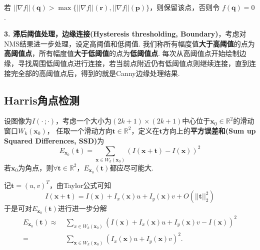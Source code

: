 \documentclass[12pt, a4paper, oneside]{ctexart}
\numberwithin{equation}{section}  %
\theoremstyle{definition}
\def\bd{\boldsymbol}        %
\def\R{\mathbb{R}}          %
\def\add{\vspace{1ex}}      %
\begin{document}
若
\(||\nabla f||(\boldsymbol{q}) > \max\bigg\{||\nabla f||(\boldsymbol{r}),||\nabla f||(\boldsymbol{p})\bigg\}\)，则保留该点，否则令
\(f(\boldsymbol{q}) = 0\).\add

\textbf{3. 滞后阈值处理，边缘连接(Hysteresis thresholding, Boundary)}，考虑对NMS结果进一步处理，设定高阈值和低阈值.
我们称所有幅度值\textbf{大于高阈值}的点为\textbf{高阈值点}，所有幅度值\textbf{大于低阈值}的点为\textbf{低阈值点}.
每次从高阈值点开始绘制边缘，寻找周围低阈值点进行连接，若当前点附近仍有低阈值点则继续连接，直到连接完全部的高阈值点后，得到的就是Canny边缘处理结果.

\subsection{Harris角点检测}  %
设图像为$I(\cdot\, ;\cdot)$，考虑一个大小为$(2k+1)\times (2k+1)$中心位于$\bd{x}_0\in\R^2$的滑动窗口$W_k(\bd{x}_0)$，
任取一个滑动方向$\bd{t}\in\R^2$，定义在$\bd{t}$方向上的\textbf{平方误差和(Sum up Squared Differences, SSD)}为
\begin{equation*}
    E_{\bd{x}_0}(\bd{t}) = \sum_{\bd{x}\in W_k(\bd{x}_0)}\left(I(\bd{x}+\bd{t})-I(\bd{x})\right)^2
\end{equation*}
若$\bd{x}_0$为角点，则$\forall \bd{t}\in\R^2$，$E_{\bd{x}_0}(\bd{t})$都应尽可能大.

记$\bd{t} = (u,v)^T$，由Taylor公式可知
\begin{equation*}
    I(\bd{x} + \bd{t}) = I(\bd{x}) + I_x(\bd{x})u+I_y(\bd{x})v+O(||\bd{t}||_2^2)
\end{equation*}
于是可对$E_{\bd{x}_0}(\bd{t})$进行进一步分解
\begin{align*}
    E_{\bd{x}_0}(\bd{t})\approx&\  \sum_{x\in W_k(\bd{x}_0)}\left(I(\bd{x}) + I_x(\bd{x})u+I_y(\bd{x})v-I(\bd{x})\right)^2\\
    =&\ \sum_{\bd{x}\in W_k(\bd{x}_0)}\left(I_x(\bd{x})u+I_y(\bd{x})v\right)^2.
\end{align*}
\end{document}
